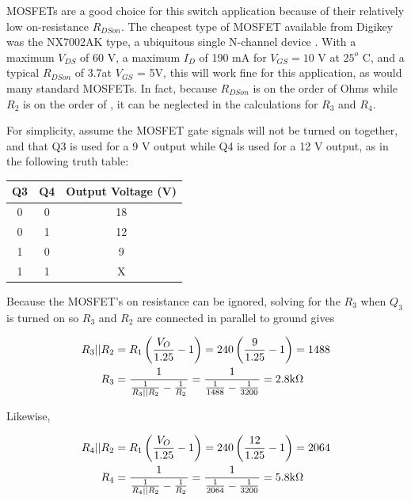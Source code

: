 

		MOSFETs are a good choice for this switch application because of their relatively low on-resistance $R_{DSon}$.  The cheapest type of MOSFET available from Digikey was the NX7002AK type, a ubiquitous single N-channel device \cite{NX7002AKdatasheet}.  With a maximum $V_{DS}$ of 60 V, a maximum $I_D$ of 190 mA for $V_{GS} = 10$ V at $25^o$ C, and a typical $R_{DSon}$ of 3.7\ohm at $V_{GS}$ = 5V, this will work fine for this application, as would many standard MOSFETs.  In fact, because $R_{DSon}$ is on the order of Ohms while $R_2$ is on the order of \kohm, it can be neglected in the calculations for $R_3$ and $R_4$.

		For simplicity, assume the MOSFET gate signals will not be turned on together, and that Q3 is used for a 9 V output while Q4 is used for a 12 V output, as in the following truth table:

		\begin{center}
		\begin{tabular}{c c|c}
			Q3 & Q4 & Output Voltage (V) \\
			\hline
			0 & 0 & 18 \\
			0 & 1 & 12 \\
			1 & 0 & 9 \\
			1 & 1 & X
		\end{tabular}
		\end{center}

		Because the MOSFET's on resistance can be ignored, solving for the $R_3$ when $Q_3$ is turned on so $R_3$ and $R_2$ are connected in parallel to ground gives

		\begin{align}
			R_3 || R_2 &= R_1 \left( \frac{V_O}{1.25} - 1 \right) = 240 \left( \frac{9}{1.25} - 1 \right) = 1488 \\
			R_3 &= \frac{1}{\frac{1}{R_3 || R_2} - \frac{1}{R_2}} = \frac{1}{\frac{1}{1488} - \frac{1}{3200}} = 2.8 \text{k$\Omega$\:}
		\end{align}

		Likewise, 

		\begin{align}
			R_4 || R_2 &= R_1 \left( \frac{V_O}{1.25} - 1 \right) = 240 \left( \frac{12}{1.25} - 1 \right) = 2064 \\
			R_4 &= \frac{1}{\frac{1}{R_4 || R_2} - \frac{1}{R_2}} = \frac{1}{\frac{1}{2064} - \frac{1}{3200}} = 5.8 \text{k$\Omega$\:}
		\end{align}

